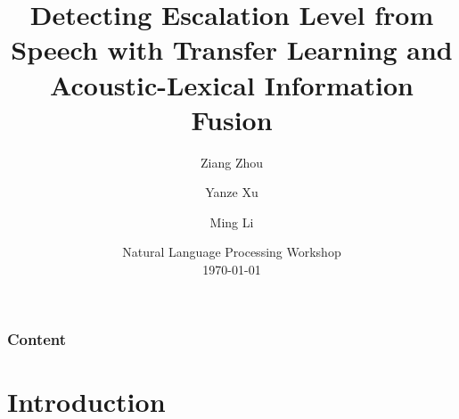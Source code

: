 \documentclass[
	11pt, %
]{beamer}
\title[Escalation Detection]{Detecting Escalation Level from Speech with Transfer Learning and Acoustic-Lexical Information Fusion} %
\author[Ziang Zhou \and Yanze Xu \and Ming Li]{Ziang Zhou \and Yanze Xu \and Ming Li} %
\institute[DKU]{Duke Kunshan University \\ \smallskip \textit{ziang.zhou372@dukekunshan.edu.cn}} %
\date[\today]{Natural Language Processing Workshop \\ \today} %
\begin{document}

\begin{frame}
	\titlepage %
\end{frame}



\begin{frame}
	\frametitle{Content} %
	
	\tableofcontents %
\end{frame}


\section{Introduction} %
\end{document}
